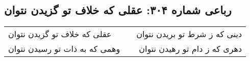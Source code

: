 \begin{center}
\section*{رباعی شماره ۳۰۴: عقلی که خلاف تو گزیدن نتوان}
\label{sec:sh304}
\begin{longtable}{l p{0.5cm} r}
عقلی که خلاف تو گزیدن نتوان
&&
دینی که ز شرط تو بریدن نتوان
\\
وهمی که به ذات تو رسیدن نتوان
&&
دهری که ز دام تو رهیدن نتوان
\\
\end{longtable}
\end{center}

